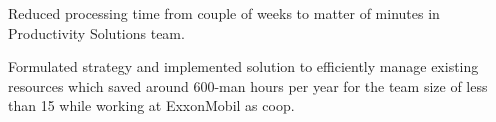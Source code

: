 

\begin{cventries}
\vspace{-5mm}
  \cventry
    {}
    {}
    {}
    {}
    {
      \begin{cvitems}
        \item {Reduced processing time from couple of weeks to matter of minutes in Productivity Solutions team.}
        \item {Formulated strategy and implemented solution to efficiently manage existing resources which saved around 600-man hours per year for the team size of less than 15 while working at ExxonMobil as coop.}
      \end{cvitems}
    }
\end{cventries}